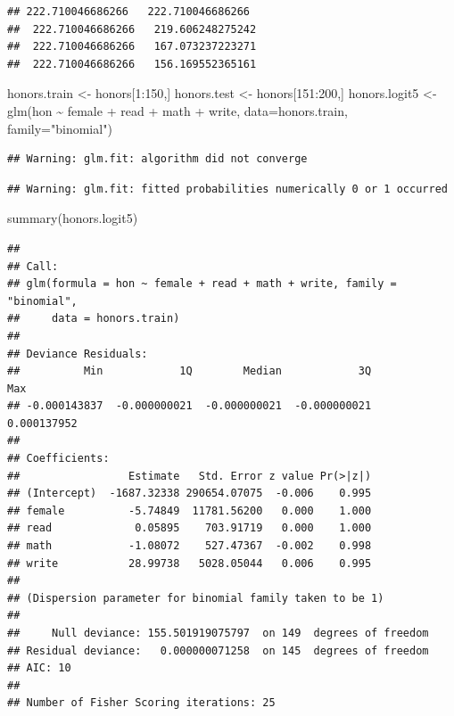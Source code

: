 \documentclass[
]{article}
\newenvironment{Shaded}{\begin{snugshade}}{\end{snugshade}}
\newcommand{\AttributeTok}[1]{\textcolor[rgb]{0.77,0.63,0.00}{#1}}
\newcommand{\DecValTok}[1]{\textcolor[rgb]{0.00,0.00,0.81}{#1}}
\newcommand{\FunctionTok}[1]{\textcolor[rgb]{0.00,0.00,0.00}{#1}}
\newcommand{\NormalTok}[1]{#1}
\newcommand{\OtherTok}[1]{\textcolor[rgb]{0.56,0.35,0.01}{#1}}
\newcommand{\SpecialCharTok}[1]{\textcolor[rgb]{0.00,0.00,0.00}{#1}}
\newcommand{\StringTok}[1]{\textcolor[rgb]{0.31,0.60,0.02}{#1}}
\begin{document}
\begin{verbatim}
## 222.710046686266   222.710046686266 
##  222.710046686266   219.606248275242 
##  222.710046686266   167.073237223271 
##  222.710046686266   156.169552365161
\end{verbatim}

\begin{Shaded}
\begin{Highlighting}[]
\NormalTok{honors.train }\OtherTok{\textless{}{-}}\NormalTok{ honors[}\DecValTok{1}\SpecialCharTok{:}\DecValTok{150}\NormalTok{,]}
\NormalTok{honors.test }\OtherTok{\textless{}{-}}\NormalTok{ honors[}\DecValTok{151}\SpecialCharTok{:}\DecValTok{200}\NormalTok{,]}
\NormalTok{honors.logit5 }\OtherTok{\textless{}{-}} \FunctionTok{glm}\NormalTok{(hon }\SpecialCharTok{\textasciitilde{}}\NormalTok{ female }\SpecialCharTok{+}\NormalTok{ read }\SpecialCharTok{+}\NormalTok{ math }\SpecialCharTok{+}\NormalTok{ write, }\AttributeTok{data=}\NormalTok{honors.train, }\AttributeTok{family=}\StringTok{"binomial"}\NormalTok{)}
\end{Highlighting}
\end{Shaded}

\begin{verbatim}
## Warning: glm.fit: algorithm did not converge
\end{verbatim}

\begin{verbatim}
## Warning: glm.fit: fitted probabilities numerically 0 or 1 occurred
\end{verbatim}

\begin{Shaded}
\begin{Highlighting}[]
\FunctionTok{summary}\NormalTok{(honors.logit5)}
\end{Highlighting}
\end{Shaded}

\begin{verbatim}
## 
## Call:
## glm(formula = hon ~ female + read + math + write, family = "binomial", 
##     data = honors.train)
## 
## Deviance Residuals: 
##          Min            1Q        Median            3Q           Max  
## -0.000143837  -0.000000021  -0.000000021  -0.000000021   0.000137952  
## 
## Coefficients:
##                 Estimate   Std. Error z value Pr(>|z|)
## (Intercept)  -1687.32338 290654.07075  -0.006    0.995
## female          -5.74849  11781.56200   0.000    1.000
## read             0.05895    703.91719   0.000    1.000
## math            -1.08072    527.47367  -0.002    0.998
## write           28.99738   5028.05044   0.006    0.995
## 
## (Dispersion parameter for binomial family taken to be 1)
## 
##     Null deviance: 155.501919075797  on 149  degrees of freedom
## Residual deviance:   0.000000071258  on 145  degrees of freedom
## AIC: 10
## 
## Number of Fisher Scoring iterations: 25
\end{verbatim}
\end{document}
